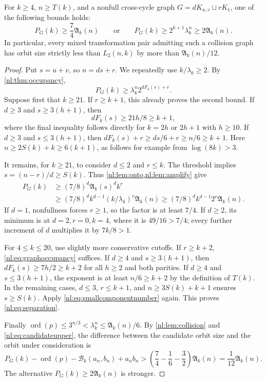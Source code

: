 \documentclass[11pt,a4paper]{article}
\numberwithin{equation}{section}
\theoremstyle{definition}
\theoremstyle{remark}
\newcommand{\ord}{\operatorname{ord}}
\newcommand{\Bip}{\mathcal B}
\newcommand{\nlenv}{\mathfrak A}
\begin{document}
\begin{proposition}\label{nl:prop:nonfull}
For $k\ge4$, $n\ge T(k)$, and a nonfull cross-cycle graph
$G=dK_{u,v}\sqcup rK_1$, one of the following bounds holds:
\begin{equation}\label{nl:eq:separation}
 P_G(k)\ge\frac74\nlenv_k(n)
 \qquad\text{or}\qquad
 P_G(k)\ge2^{k+1}\lambda_k^n\ge2\nlenv_k(n).
\end{equation}
In particular, every mixed transformation pair admitting such a collision
graph has orbit size strictly less than $L_2(n,k)$ by more than
$\nlenv_k(n)/12$.
\end{proposition}
\begin{proof}
Put $s=u+v$, so $n=ds+r$. We repeatedly use $k/\lambda_k\ge2$.
By \cref{nl:thm:occupancy},
\begin{equation}\label{nl:eq:graphoccupancy}
 P_G(k)\ge\lambda_k^n 2^{dF_k(s)+r}.
\end{equation}
Suppose first that $k\ge21$. If $r\ge k+1$, this already proves the
second bound. If $d\ge3$ and $s\ge3(h+1)$, then
\[
 dF_k(s)\ge21h/8\ge k+1,
\]
where the final inequality follows directly for $k=2h$ or $2h+1$ with
$h\ge10$. If $d\ge3$ and $s\le3(h+1)$, then
$dF_k(s)+r\ge ds/6+r\ge n/6\ge k+1$.
Here $n\ge2S(k)+k\ge6(k+1)$, as follows for example from
$\log(8k)>3$.

It remains, for $k\ge21$, to consider $d\le2$ and $r\le k$.
The threshold implies
$s=(n-r)/d\ge S(k)$. Thus \cref{nl:lem:onto,nl:lem:amplify} give
\begin{align}
 P_G(k)&\ge(7/8)^d\nlenv_k(s)^d k^r\\
 &\ge(7/8)^d k^{d-1}(k/\lambda_k)^r\nlenv_k(n)
 \ge(7/8)^d k^{d-1}2^r\nlenv_k(n).\label{nl:eq:smallcomponentnumber}
\end{align}
If $d=1$, nonfullness forces $r\ge1$, so the factor is at least $7/4$.
If $d\ge2$, its minimum is at $d=2,r=0,k=4$, where it is
$49/16>7/4$; every further increment of $d$ multiplies it by
$7k/8>1$.

For $4\le k\le20$, use slightly more conservative cutoffs.
If $r\ge k+2$, \eqref{nl:eq:graphoccupancy} suffices.
If $d\ge4$ and $s\ge3(h+1)$, then
$dF_k(s)\ge7h/2\ge k+2$ for all $h\ge2$ and both parities.
If $d\ge4$ and $s\le3(h+1)$, the exponent is at least
$n/6\ge k+2$ by the definition of $T(k)$.
In the remaining cases, $d\le3$, $r\le k+1$, and
$n\ge3S(k)+k+1$ ensures $s\ge S(k)$. Apply
\eqref{nl:eq:smallcomponentnumber} again. This proves \eqref{nl:eq:separation}.

Finally $\ord(p)\le3^{n/3}<\lambda_k^n\le\nlenv_k(n)/6$.
By \cref{nl:lem:collision} and \eqref{nl:eq:candidateupper}, the difference
between the candidate orbit size and the orbit under consideration is
\[
 P_G(k)-\ord(p)-\Bip_k(a_n,b_n)+a_nb_n
 >\left(\frac74-\frac16-\frac32\right)\nlenv_k(n)
 =\frac1{12}\nlenv_k(n).
\]
The alternative $P_G(k)\ge2\nlenv_k(n)$ is stronger.
\end{proof}
\end{document}
